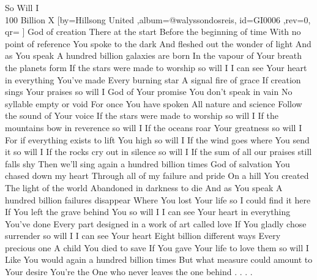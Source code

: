 \beginsong
{So Will I\\100 Billion X %
}[by={Hillsong United %
},album={@walyssondosreis},
id={GI0006 %
},rev={0}, %
qr={ %
}]
\beginverse
God of creation
There at the start
Before the beginning of time
With no point of reference
You spoke to the dark
And fleshed out the wonder of light
\endverse
\beginchorus
And as You speak
A hundred billion galaxies are born
In the vapour of Your breath the planets form
If the stars were made to worship so will I
I can see Your heart in everything You've made
Every burning star
A signal fire of grace
If creation sings Your praises so will I
\endchorus
\beginverse
God of Your promise
You don't speak in vain
No syllable empty or void
For once You have spoken
All nature and science
Follow the sound of Your voice
\endverse
\beginverse
If the stars were made to worship so will I
If the mountains bow in reverence so will I
If the oceans roar Your greatness so will I
For if everything exists to lift You high so will I
If the wind goes where You send it so will I
If the rocks cry out in silence so will I
If the sum of all our praises still falls shy
Then we'll sing again a hundred billion times
\endverse
\beginverse
God of salvation
You chased down my heart
Through all of my failure and pride
On a hill You created
The light of the world
Abandoned in darkness to die
\endverse
\beginverse
And as You speak
A hundred billion failures disappear
Where You lost Your life so I could find it here
If You left the grave behind You so will I
I can see Your heart in everything You've done
Every part designed in a work of art called love
If You gladly chose surrender so will I
I can see Your heart
Eight billion different ways
Every precious one
A child You died to save
If You gave Your life to love them so will I
\endverse
\beginverse
Like You would again a hundred billion times
But what measure could amount to Your desire
You're the One who never leaves the one behind
\endverse
\beginverse*
.
.
.
.
